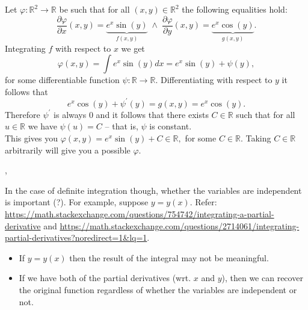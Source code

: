 \documentclass[../MathsNotesBase.tex]{subfiles}
\begin{document}
{		\medskip
		\begin{exe}
			\item{
				Let $\varphi: \mathbb{R}^{2} \rightarrow \mathbb{R}$ be such that for all $(x, y) \in \mathbb{R}^{2}$ the following equalities hold:
				\[
				\frac{\partial \varphi}{\partial x}(x, y)=\underbrace{e^{x} \sin (y)}_{f(x, y)} \; \wedge \; \frac{\partial \varphi}{\partial y}(x, y)=\underbrace{e^{x} \cos (y)}_{g(x, y)}.
				\]
				Integrating $f$ with respect to $x$ we get
				\[ \varphi(x, y)=\int e^{x} \sin (y) d x=e^{x} \sin (y)+\psi(y), \]
				for some differentiable function $\psi: \mathbb{R} \rightarrow \mathbb{R}$. Differentiating with respect to $y$ it follows that 
				\[ e^{x} \cos (y)+\psi^{\prime}(y)=g(x, y)=e^{x} \cos (y). \]
				Therefore $\psi^{\prime}$ is always 0 and it follows that there exists $C \in \mathbb{R}$ such that for all $u \in \mathbb{R}$ we have $\psi(u)=C$ -- that is, $\psi$ is constant.\\
				This gives you $\varphi(x, y)=e^{x} \sin (y)+C \in \mathbb{R},$ for some $C \in \mathbb{R}$. Taking $C \in \mathbb{R}$ arbitrarily will give you a possible $\varphi$.
			}
		\end{exe}
	
		\sep
		
		In the case of definite integration though, whether the variables are independent is important (?). For example, suppose ${ y = y(x) }$. Refer: \url{https://math.stackexchange.com/questions/754742/integrating-a-partial-derivative} and \url{https://math.stackexchange.com/questions/2714061/integrating-partial-derivatives?noredirect=1&lq=1}.
		
		\begin{itemize}
			\item{If ${ y = y(x) }$ then the result of the integral may not be meaningful.}
			\item{If we have both of the partial derivatives (wrt. $x$ and $y$), then we can recover the original function regardless of whether the variables are independent or not.}
		\end{itemize}
	}
\end{document}
